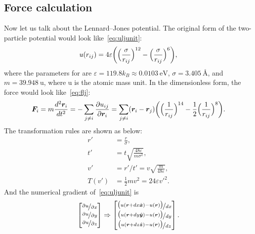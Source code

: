 \subsection{Force calculation}\label{ssec:force}

Now let us talk about the Lennard--Jones potential.
The original form of the two-particle potential would look like~\eqref{eq:uljunit}:
%
\begin{equation}\label{eq:uljunit}
    u(r_{ij}) = 4 \varepsilon \biggl( \Bigl( \frac{ \sigma }{ r_{ij} } \Bigr)^{12}
    -\Bigl( \frac{ \sigma }{ r_{ij} } \Bigr)^6 \biggr),
\end{equation}
%
where the parameters for  are \(\varepsilon = 119.8 k_B \approx \SI{0.0103}{\electronvolt}\),
\(\sigma = \SI{3.405}{\angstrom}\), and \(m = \SI{39.948}{\atomicmassunit}\), where
\(\si{\atomicmassunit}\) is the atomic mass unit.
In the dimensionless form,
the force would look like~\eqref{eq:flj}:
%
\begin{equation}\label{eq:flj}
    \bm{F}_i = m\frac{ d^2 \bm{r}_i }{ d t^2 } = -\sum_{j \neq i}\frac{ \partial u_{ij} }{ \partial \bm{r}_i }
    = \sum_{j \neq i} (\bm{r}_i - \bm{r}_j)
    \biggl( \Bigl( \frac{ 1 }{ r_{ij} } \Bigr)^{14}
    -\frac{ 1 }{ 2 } \Bigl( \frac{ 1 }{ r_{ij} } \Bigr)^8 \biggr).
\end{equation}
%
The transformation rules are shown as below:
%
\begin{align}
    r'    & = \frac{ r }{ \sigma },                                          \\
    t'    & = t \sqrt{\frac{ 48 \varepsilon }{ m \sigma^2 }},                \\
    v'    & = r' / t' = v \sqrt{\frac{ m }{ 48 \varepsilon }},               \\
    T(v') & = \frac{ 1 }{ 2 } m v^2 = 24 \varepsilon v'^2.\label{eq:kinetic}
\end{align}
%
And the numerical gradient of~\eqref{eq:uljunit} is
%
\begin{equation}\label{eq:dudr}
    \begin{bmatrix}
        \nicefrac{ \partial u }{ \partial x } \\
        \nicefrac{ \partial u }{ \partial y } \\
        \nicefrac{ \partial u }{ \partial z }
    \end{bmatrix}
    \Rightarrow
    \begin{bmatrix}
        \nicefrac{ \bigl( u(\bm{r} + dx \hat{\bm{x}}) - u(\bm{r}) \bigr) }{ dx } \\
        \nicefrac{ \bigl( u(\bm{r} + dy \hat{\bm{y}}) - u(\bm{r}) \bigr) }{ dy } \\
        \nicefrac{ \bigl( u(\bm{r} + dz \hat{\bm{z}}) - u(\bm{r}) \bigr) }{ dz }
    \end{bmatrix}.
\end{equation}
